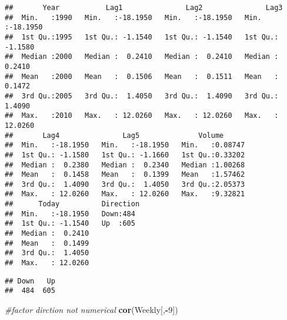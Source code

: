 \documentclass[]{article}
\newenvironment{Shaded}{\begin{snugshade}}{\end{snugshade}}
\newcommand{\CommentTok}[1]{\textcolor[rgb]{0.56,0.35,0.01}{\textit{#1}}}
\newcommand{\DecValTok}[1]{\textcolor[rgb]{0.00,0.00,0.81}{#1}}
\newcommand{\KeywordTok}[1]{\textcolor[rgb]{0.13,0.29,0.53}{\textbf{#1}}}
\newcommand{\NormalTok}[1]{#1}
\newcommand{\OperatorTok}[1]{\textcolor[rgb]{0.81,0.36,0.00}{\textbf{#1}}}
\begin{document}
\begin{verbatim}
##       Year           Lag1               Lag2               Lag3         
##  Min.   :1990   Min.   :-18.1950   Min.   :-18.1950   Min.   :-18.1950  
##  1st Qu.:1995   1st Qu.: -1.1540   1st Qu.: -1.1540   1st Qu.: -1.1580  
##  Median :2000   Median :  0.2410   Median :  0.2410   Median :  0.2410  
##  Mean   :2000   Mean   :  0.1506   Mean   :  0.1511   Mean   :  0.1472  
##  3rd Qu.:2005   3rd Qu.:  1.4050   3rd Qu.:  1.4090   3rd Qu.:  1.4090  
##  Max.   :2010   Max.   : 12.0260   Max.   : 12.0260   Max.   : 12.0260  
##       Lag4               Lag5              Volume       
##  Min.   :-18.1950   Min.   :-18.1950   Min.   :0.08747  
##  1st Qu.: -1.1580   1st Qu.: -1.1660   1st Qu.:0.33202  
##  Median :  0.2380   Median :  0.2340   Median :1.00268  
##  Mean   :  0.1458   Mean   :  0.1399   Mean   :1.57462  
##  3rd Qu.:  1.4090   3rd Qu.:  1.4050   3rd Qu.:2.05373  
##  Max.   : 12.0260   Max.   : 12.0260   Max.   :9.32821  
##      Today          Direction 
##  Min.   :-18.1950   Down:484  
##  1st Qu.: -1.1540   Up  :605  
##  Median :  0.2410             
##  Mean   :  0.1499             
##  3rd Qu.:  1.4050             
##  Max.   : 12.0260
\end{verbatim}

\begin{Shaded}
\end{Shaded}

\begin{verbatim}
## Down   Up 
##  484  605
\end{verbatim}

\begin{Shaded}
\begin{Highlighting}[]
\CommentTok{#factor dirction not numerical}
\KeywordTok{cor}\NormalTok{(Weekly[,}\OperatorTok{-}\DecValTok{9}\NormalTok{])}
\end{Highlighting}
\end{Shaded}
\end{document}
